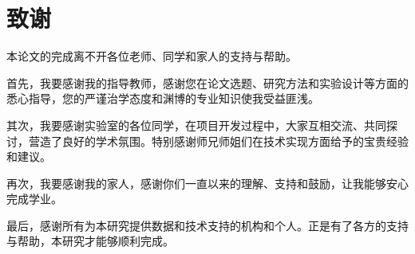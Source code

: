 \section{致\quad 谢}

本论文的完成离不开各位老师、同学和家人的支持与帮助。

首先，我要感谢我的指导教师，感谢您在论文选题、研究方法和实验设计等方面的悉心指导，您的严谨治学态度和渊博的专业知识使我受益匪浅。

其次，我要感谢实验室的各位同学，在项目开发过程中，大家互相交流、共同探讨，营造了良好的学术氛围。特别感谢师兄师姐们在技术实现方面给予的宝贵经验和建议。

再次，我要感谢我的家人，感谢你们一直以来的理解、支持和鼓励，让我能够安心完成学业。

最后，感谢所有为本研究提供数据和技术支持的机构和个人。正是有了各方的支持与帮助，本研究才能够顺利完成。
